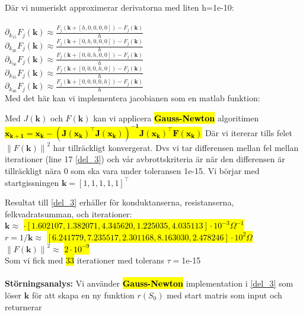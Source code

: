 \documentclass{assignment}
\def\code#1{\texttt{#1}}
\begin{document}
\\
\\ Där vi numeriskt approximerar derivatorna med liten h=1e-10:
\\ 
\\ $\partial_{k_{15}} F_j(\mathbf{k}) \approx \frac{F_j(\mathbf{k}+[h,0,0,0,0]) - F_j(\mathbf{k})}{h}$
\\ $\partial_{k_{26}} F_j(\mathbf{k}) \approx \frac{F_j(\mathbf{k}+[0,h,0,0,0]) - F_j(\mathbf{k})}{h}$
\\ $\partial_{k_{56}} F_j(\mathbf{k}) \approx \frac{F_j(\mathbf{k}+[0,0,h,0,0]) - F_j(\mathbf{k})}{h}$
\\ $\partial_{k_{35}} F_j(\mathbf{k}) \approx \frac{F_j(\mathbf{k}+[0,0,0,h,0]) - F_j(\mathbf{k})}{h}$
\\ $\partial_{k_{46}} F_j(\mathbf{k}) \approx \frac{F_j(\mathbf{k}+[0,0,0,0,h]) - F_j(\mathbf{k})}{h}$
\\ Med det här kan vi implementera jacobianen som en matlab funktion:
 
Med $J(\mathbf{k})$ och $F(\mathbf{k})$ kan vi applicera \hl{\textbf{Gauss-Newton}} algoritimen \hl{$\mathbf{x_{k+1} = x_{k}- (J(x_k)^\top J(x_k))^{-1}J(x_k)^\top F(x_k)}$}
Där vi itererar tills felet  $\left\| F(\mathbf{k})\right\|^2$ har tillräckligt konvergerat. Dvs vi tar differensen mellan fel mellan iterationer (line 17 \cref{del_3}) 
och vår avbrottskriteria är när den differensen är tillräckligt nära $0$ som ska vara under toleransen 1e-15. Vi börjar med startgissningen $\mathbf{k} = [1,1,1,1,1]^\top$
 
Resultat till \cref{del_3} erhåller för konduktanserna, resistanserna, felkvadratsumman, och iterationer:
\\ $\mathbf{k}\approx$ \hl{$\cdot[1.602107,1.382071,4.345620,1.225035,4.035113]\cdot 10^{-3}\Omega^{-1}$}
\\ $r=1/ \mathbf{k} \approx$ \hl{$[6.241779,7.235517, 2.301168, 8.163030, 2.478246]\cdot 10^{2}\Omega$}
\\ $\left\|F(\mathbf{k})\right\|^2\approx$ \hl{$2\cdot 10^{-9}$}
\\ Som vi fick med \hl{33} iterationer med tolerans $\tau=$1e-15 
\\ \\ \textbf{Störningsanalys:} Vi använder \hl{\textbf{Gauss-Newton}} implementation i \cref{del_3} som löser $\mathbf{k}$ för att skapa en ny funktion $r(S_0)$ med start matris som input och returnerar 
\end{document}
